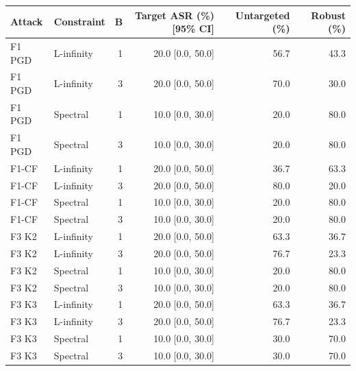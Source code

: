\begin{tabular}{llrrrr}
\toprule
Attack & Constraint & B & Target ASR (\%) [95\% CI] & Untargeted (\%) & Robust (\%) \\
\midrule
F1 PGD & L-infinity & 1 & 20.0 [0.0, 50.0] & 56.7 & 43.3 \\
F1 PGD & L-infinity & 3 & 20.0 [0.0, 50.0] & 70.0 & 30.0 \\
F1 PGD & Spectral & 1 & 10.0 [0.0, 30.0] & 20.0 & 80.0 \\
F1 PGD & Spectral & 3 & 10.0 [0.0, 30.0] & 20.0 & 80.0 \\
F1-CF & L-infinity & 1 & 20.0 [0.0, 50.0] & 36.7 & 63.3 \\
F1-CF & L-infinity & 3 & 20.0 [0.0, 50.0] & 80.0 & 20.0 \\
F1-CF & Spectral & 1 & 10.0 [0.0, 30.0] & 20.0 & 80.0 \\
F1-CF & Spectral & 3 & 10.0 [0.0, 30.0] & 20.0 & 80.0 \\
F3 K2 & L-infinity & 1 & 20.0 [0.0, 50.0] & 63.3 & 36.7 \\
F3 K2 & L-infinity & 3 & 20.0 [0.0, 50.0] & 76.7 & 23.3 \\
F3 K2 & Spectral & 1 & 10.0 [0.0, 30.0] & 20.0 & 80.0 \\
F3 K2 & Spectral & 3 & 10.0 [0.0, 30.0] & 20.0 & 80.0 \\
F3 K3 & L-infinity & 1 & 20.0 [0.0, 50.0] & 63.3 & 36.7 \\
F3 K3 & L-infinity & 3 & 20.0 [0.0, 50.0] & 76.7 & 23.3 \\
F3 K3 & Spectral & 1 & 10.0 [0.0, 30.0] & 30.0 & 70.0 \\
F3 K3 & Spectral & 3 & 10.0 [0.0, 30.0] & 30.0 & 70.0 \\
\bottomrule
\end{tabular}
